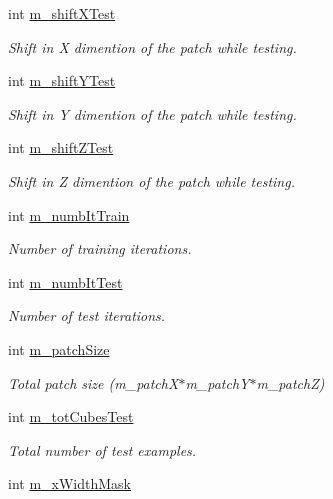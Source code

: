 \begin{DoxyCompactItemize}
int \hyperlink{classDataReader_a066a1c0f512fccdb2b21d23cce551ee7}{m\+\_\+shift\+X\+Test}
\begin{DoxyCompactList}\small\item\em Shift in X dimention of the patch while testing. \end{DoxyCompactList}\item 
int \hyperlink{classDataReader_ab5002c766c4cebca361dd21f1d2cbc86}{m\+\_\+shift\+Y\+Test}
\begin{DoxyCompactList}\small\item\em Shift in Y dimention of the patch while testing. \end{DoxyCompactList}\item 
int \hyperlink{classDataReader_a9f9ae5a90b34758f37671671e1f002f7}{m\+\_\+shift\+Z\+Test}
\begin{DoxyCompactList}\small\item\em Shift in Z dimention of the patch while testing. \end{DoxyCompactList}\item 
int \hyperlink{classDataReader_a1a78f7b37cb3908c3db5ee4538c2c932}{m\+\_\+numb\+It\+Train}
\begin{DoxyCompactList}\small\item\em Number of training iterations. \end{DoxyCompactList}\item 
int \hyperlink{classDataReader_a9a9f00295f7d5aaca78539802fe09c6c}{m\+\_\+numb\+It\+Test}
\begin{DoxyCompactList}\small\item\em Number of test iterations. \end{DoxyCompactList}\item 
int \hyperlink{classDataReader_a9ae84cb0ea7dd165616880737280e6b6}{m\+\_\+patch\+Size}
\begin{DoxyCompactList}\small\item\em Total patch size (m\+\_\+patch\+X$\ast$m\+\_\+patch\+Y$\ast$m\+\_\+patchZ) \end{DoxyCompactList}\item 
int \hyperlink{classDataReader_a1a13928367a9c5d02f6e11d2d742e429}{m\+\_\+tot\+Cubes\+Test}
\begin{DoxyCompactList}\small\item\em Total number of test examples. \end{DoxyCompactList}\item 
int \hyperlink{classDataReader_af20e42b5dc09a33b2c2704cb58d01803}{m\+\_\+x\+Width\+Mask}

\end{DoxyCompactItemize}
